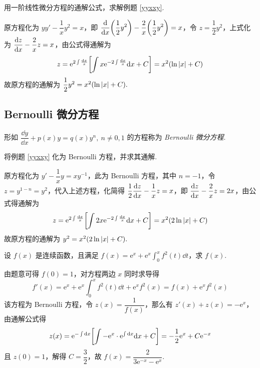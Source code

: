 \begin{example}
    用一阶线性微分方程的通解公式，求解例题 \ref{yyxxy}.
\end{example}
\begin{solution}
    原方程化为 $yy'-\dfrac{1}{x}y^2=x$，即 $\displaystyle\dv{x}\qty(\dfrac{1}{2}y^2)-\dfrac{2}{x}\qty(\dfrac{1}{2}y^2)=x$，令 $z=\dfrac{1}{2}y^2$，上式化为
    $\displaystyle\dv{z}{x}-\dfrac{2}{x}z=x$，由公式得通解为
    $$z=\mathrm{e}^{2\int\frac{\dd x}{x}}\qty[\int x\mathrm{e}^{-2\int\frac{\dd x}{x}}\dd x+C]=x^2\qty(\ln|x|+C)$$
    故原方程的通解为 $\dfrac{1}{2}y^2=x^2\qty(\ln|x|+C).$
\end{solution}

\subsection{Bernoulli 微分方程}

\begin{definition}
    形如 $\dfrac{\dd y}{\dd x}+p(x)y=q(x)y^n,~n\not=0,1$ 的方程称为 \textit{Bernoulli 微分方程}.
\end{definition}

\begin{example}
    将例题 \ref{yyxxy} 化为 Bernoulli 方程，并求其通解.
\end{example}
\begin{solution}
    原方程化为 $y'-\dfrac{1}{x}y=xy^{-1}$，此为 Bernoulli 方程，其中 $n=-1$，令 $z=y^{1-n}=y^2$，代入上述方程，化简得
    $\dfrac{1}{2}\displaystyle\dv{z}{x}-\dfrac{1}{x}z=x$，即 $\displaystyle\dv{z}{x}-\dfrac{2}{x}z=2x$，由公式得通解为
    $$z=\mathrm{e}^{2\int\frac{\dd x}{x}}\qty[\int 2x\mathrm{e}^{-2\int\frac{\dd x}{x}}\dd x+C]=x^2\qty(2\ln|x|+C)$$
    故原方程的通解为 $y^2=x^2\qty(2\ln|x|+C).$
\end{solution}

\begin{example}[2023 合肥工业大学]
    设 $f(x)$ 是连续函数，且满足 $f(x)=\mathrm{e}^x+\mathrm{e}^x\displaystyle\int_{0}^{x}f^2(t)\dd t$，求 $f(x)$.
\end{example}
\begin{solution}
    由题意可得 $f(0)=1$，对方程两边 $x$ 同时求导得
    $$f'(x)=\mathrm{e}^x+\mathrm{e}^x\int_{0}^{x}f^2(t)\dd t+\mathrm{e}^xf^2(x)=f(x)+\mathrm{e}^xf^2(x)$$
    该方程为 Bernoulli 方程，令 $z(x)=\dfrac{1}{f(x)}$，那么有 $z'(x)+z(x)=-\mathrm{e}^x$，由通解公式得
    $$z(x)=\mathrm{e}^{-\int\dd x}\qty[\int-\mathrm{e}^x\cdot\mathrm{e}^{\int\dd x}\dd x+C]=-\dfrac{1}{2}\mathrm{e}^x+C\mathrm{e}^{-x}$$
    且 $z(0)=1$，解得 $C=\dfrac{3}{2}$，故 $f(x)=\dfrac{2}{3\mathrm{e}^{-x}-\mathrm{e}^x}.$
\end{solution}


